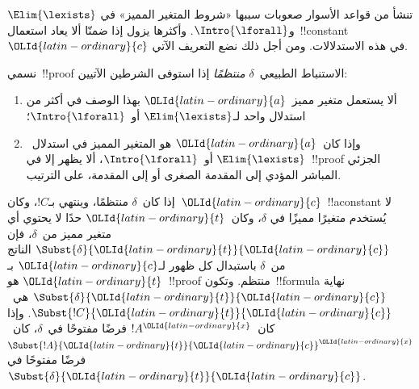 \documentclass[../../../include/open-logic-section]{subfiles}
\begin{document}


تنشأ من قواعد الأسوار صعوبات سببها «شروط المتغير المميز» في
$\Elim{\lexists}$ و$\Intro{\lforall}$. وأكثرها يزول إذا ضمنّا ألا يعاد
استعمال~!!{constant}~$\OLId{latin-ordinary}{c}$ في هذه الاستدلالات. ومن أجل ذلك نضع التعريف
الآتي.

\begin{defn}
نسمي~!!{proof} الاستنباط الطبيعي~$\delta$ \emph{منتظمًا} إذا استوفى
الشرطين الآتيين:
\begin{enumerate}
  \item ألا يستعمل متغير مميز~$\OLId{latin-ordinary}{a}$ بهذا الوصف في أكثر من استدلال واحد
  لـ$\Elim{\lexists}$ أو~$\Intro{\lforall}$؛
  \item وإذا كان~$\OLId{latin-ordinary}{a}$ هو المتغير المميز في استدلال~$\Elim{\lexists}$
  أو~$\Intro{\lforall}$، ألا يظهر إلا في~!!{proof} الجزئي المباشر المؤدي
  إلى المقدمة الصغرى أو إلى المقدمة، على الترتيب.
\end{enumerate}
\end{defn}

\begin{lem} إذا كان~$\delta$ منتظمًا،
وينتهي بـ$!C$، وكان~$\OLId{latin-ordinary}{c}$~!!a{constant} لا يُستخدم متغيرًا مميزًا في
$\delta$، وكان~$\OLId{latin-ordinary}{t}$ حدًا لا يحتوي أي متغير مميز من~$\delta$، فإن
$\Subst{\delta}{\OLId{latin-ordinary}{t}}{\OLId{latin-ordinary}{c}}$ الناتج من~$\delta$ باستبدال كل ظهور لـ$\OLId{latin-ordinary}{c}$ بـ
$\OLId{latin-ordinary}{t}$ هو~!!{proof} منتظم. وتكون~!!{formula} نهاية
$\Subst{\delta}{\OLId{latin-ordinary}{t}}{\OLId{latin-ordinary}{c}}$ هي~$\Subst{!C}{\OLId{latin-ordinary}{t}}{\OLId{latin-ordinary}{c}}$. وإذا كان~$!A^\OLId{latin-ordinary}{x}$ فرضًا
مفتوحًا في~$\delta$، كان~$\Subst{!A}{\OLId{latin-ordinary}{t}}{\OLId{latin-ordinary}{c}}^\OLId{latin-ordinary}{x}$ فرضًا مفتوحًا في
$\Subst{\delta}{\OLId{latin-ordinary}{t}}{\OLId{latin-ordinary}{c}}$.
\end{lem}
\end{document}
